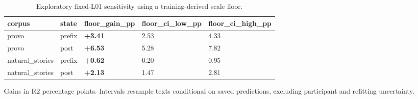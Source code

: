 \begin{table}[t]
\caption{Exploratory fixed-L01 sensitivity using a training-derived scale floor.}
\label{tab:scaling-sensitivity}
\begin{tabular}{lllll}
\toprule
corpus & state & floor\_gain\_pp & floor\_ci\_low\_pp & floor\_ci\_high\_pp \\
\midrule
provo & prefix & \textbf{+3.41} & 2.53 & 4.33 \\
provo & post & \textbf{+6.53} & 5.28 & 7.82 \\
natural\_stories & prefix & \textbf{+0.62} & 0.20 & 0.95 \\
natural\_stories & post & \textbf{+2.13} & 1.47 & 2.81 \\
\bottomrule
\end{tabular}
\par\smallskip
\begin{minipage}{\linewidth}\footnotesize
Gains in R2 percentage points. Intervals resample texts conditional on saved predictions, excluding participant and refitting uncertainty.
\end{minipage}
\end{table}
